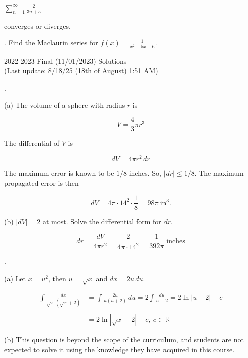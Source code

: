 \documentclass{article}
\begin{document}
\noindent $\displaystyle\sum_{n=1}^\infty\frac2{3n+5}$

\hfill

\noindent converges or diverges.

\hfill

. Find the Maclaurin series for $\displaystyle f(x)=\frac1{x^2-5x+6}$.

\newpage

\begin{center}
2022-2023 Final (11/01/2023) Solutions\\
(Last update: 8/18/25 (18th of August) 1:51 AM)
\end{center}

.

\hfill

\noindent (a) The volume of a sphere with radius $r$ is

\[V=\frac43\pi r^3\]

\hfill

\noindent The differential of $V$ is

\[dV=4\pi r^2\,dr\]

\hfill

\noindent The maximum error is known to be $1/8$ inches. So, $|dr|\leq1/8$. The maximum propagated error is then

\[dV=4\pi\cdot14^2\cdot\dfrac18=\boxed{98\pi\:\text{in}^3.}\]

\hfill

\noindent (b) $|dV|=2$ at most. Solve the differential form for $dr$.

\[dr=\frac{dV}{4\pi r^2}=\frac{2}{4\pi\cdot 14^2}=\boxed{\frac1{392\pi}\:\text{inches}}\]

\hfill

.

\hfill

\noindent (a) Let $x=u^2$, then $u=\sqrt x$ and $dx=2u\,du$.

\begin{align*}\int\frac{dx}{\sqrt x\,\left(\sqrt x+2\right)}&=\int\frac{2u}{u(u+2)}\,du=2\int\frac{du}{u+2}=2\ln|u+2|+c\\\\&=\boxed{2\ln\left|\sqrt x+2\right|+c,\: c\in\mathbb{R}}\end{align*}

\hfill

\noindent (b) This question is beyond the scope of the curriculum, and students are not expected to solve it using the knowledge they have acquired in this course.
\end{document}
